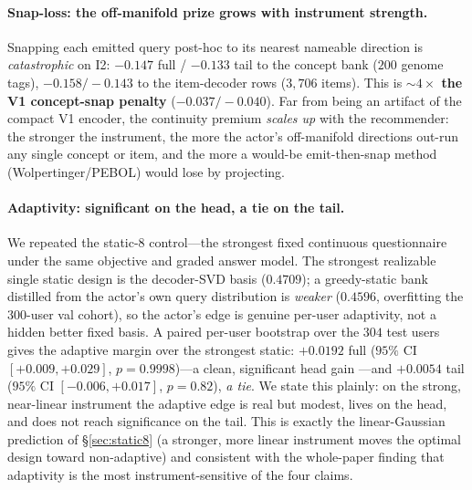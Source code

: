 \documentclass[11pt]{article}
\begin{document}
\paragraph{Snap-loss: the off-manifold prize grows with instrument strength.} Snapping each emitted query post-hoc to its
nearest nameable direction is \emph{catastrophic} on I2: $-0.147$ full / $-0.133$ tail to the concept bank ($200$ genome
tags), $-0.158/-0.143$ to the item-decoder rows ($3{,}706$ items). This is \textbf{${\sim}4\times$ the V1 concept-snap
penalty} ($-0.037/-0.040$). Far from being an artifact of the compact V1 encoder, the continuity premium \emph{scales up}
with the recommender: the stronger the instrument, the more the actor's off-manifold directions out-run any single
concept or item, and the more a would-be emit-then-snap method (Wolpertinger/PEBOL) would lose by projecting.

\paragraph{Adaptivity: significant on the head, a tie on the tail.} We repeated the static-8 control---the strongest
fixed continuous questionnaire under the same objective and graded answer model. The strongest realizable single static
design is the decoder-SVD basis ($0.4709$); a greedy-static bank distilled from the actor's own query distribution is
\emph{weaker} ($0.4596$, overfitting the $300$-user val cohort), so the actor's edge is genuine per-user adaptivity, not
a hidden better fixed basis. A paired per-user bootstrap over the $304$ test users gives the adaptive margin over the
strongest static: $\mathbf{+0.0192}$ full ($95\%$ CI $[+0.009,+0.029]$, $p{=}0.9998$)---a clean, significant head gain
---and $+0.0054$ tail ($95\%$ CI $[-0.006,+0.017]$, $p{=}0.82$), \emph{a tie}. We state this plainly: on the strong,
near-linear instrument the adaptive edge is real but modest, lives on the head, and does not reach significance on the
tail. This is exactly the linear-Gaussian prediction of \S\ref{sec:static8} (a stronger, more linear instrument moves the
optimal design toward non-adaptive) and consistent with the whole-paper finding that adaptivity is the most
instrument-sensitive of the four claims.
\end{document}

